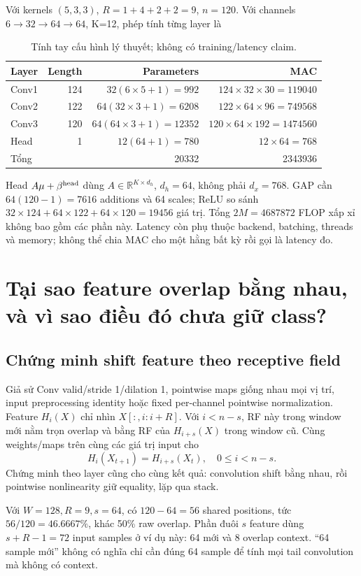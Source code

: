 \documentclass[11pt,a4paper]{article}
\newcommand{\R}{\mathbb R}
\theoremstyle{definition}
\begin{document}
Với kernels $(5,3,3)$, $R=1+4+2+2=9$, $n=120$. Với channels
$6\to32\to64\to64$, K=12, phép tính từng layer là
\begin{table}[!htbp]\centering\small
\caption{Tính tay cấu hình lý thuyết; không có training/latency claim.}
\begin{tabularx}{\linewidth}{@{}Yrrr@{}}\toprule
Layer & Length & Parameters & MAC\\\midrule
Conv1 &124&$32(6\times5+1)=992$&$124\times32\times30=119040$\\
Conv2 &122&$64(32\times3+1)=6208$&$122\times64\times96=749568$\\
Conv3 &120&$64(64\times3+1)=12352$&$120\times64\times192=1474560$\\
Head &1&$12(64+1)=780$&$12\times64=768$\\\midrule
Tổng &&20332&2343936\\\bottomrule
\end{tabularx}
\end{table}
Head $A\mu+\beta^{\rm head}$ dùng $A\in\R^{K\times d_h}$,
$d_h=64$, không phải $d_x=768$. GAP cần $64(120-1)=7616$ additions và
64 scales; ReLU so sánh $32\times124+64\times122+64\times120=19456$
giá trị. Tổng $2M=4687872$ FLOP xấp xỉ không bao gồm các phần này.
Latency còn phụ thuộc backend, batching, threads và memory; không thể chia
MAC cho một hằng bất kỳ rồi gọi là latency đo.

\section{Tại sao feature overlap bằng nhau, và vì sao điều đó chưa giữ class?}
\subsection{Chứng minh shift feature theo receptive field}
Giả sử Conv valid/stride 1/dilation 1, pointwise maps giống nhau mọi vị trí,
input preprocessing identity hoặc fixed per-channel pointwise normalization.
Feature $H_i(X)$ chỉ nhìn $X[:,i:i+R]$. Với $i<n-s$, RF này trong window
mới nằm trọn overlap và bằng RF của $H_{i+s}(X)$ trong window cũ. Cùng
weights/maps trên cùng các giá trị input cho
\begin{equation}
H_i(X_{t+1})=H_{i+s}(X_t),\quad 0\le i<n-s.
\label{eq:feature-shift}
\end{equation}
Chứng minh theo layer cũng cho cùng kết quả: convolution shift bằng nhau,
rồi pointwise nonlinearity giữ equality, lặp qua stack.

Với $W=128,R=9,s=64$, có $120-64=56$ shared positions, tức
$56/120=46.6667\%$, khác 50\% raw overlap. Phần đuôi $s$ feature dùng
$s+R-1=72$ input samples ở ví dụ này: 64 mới và 8 overlap context.
``64 sample mới'' không có nghĩa chỉ cần đúng 64 sample để tính mọi tail
convolution mà không có context.
\end{document}
